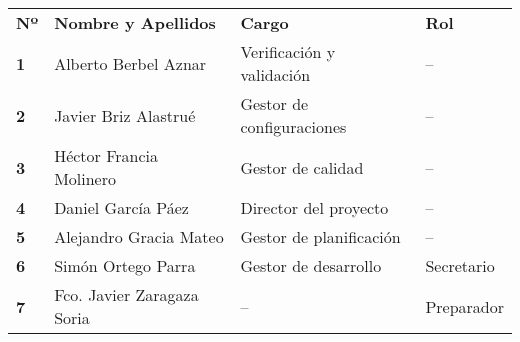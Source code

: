 \begin{longtable}{ | C{\tabcolsep} |
                     L{\tabcolsep} |
                     C{\tabcolsep} |
                     C{\tabcolsep} | }
\hline %
 \\
\hline %
{\bf Nº} & {\bf Nombre y Apellidos} & {\bf Cargo} & {\bf Rol} \\
\hline %
{\bf 1} & Alberto Berbel Aznar & Verificación y validación & --  \\
\hline %
{\bf 2} & Javier Briz Alastrué & Gestor de configuraciones & --  \\
\hline %
{\bf 3} & Héctor Francia Molinero & Gestor de calidad & --  \\
\hline %
{\bf 4} & Daniel García Páez & Director del proyecto & -- \\
\hline %
{\bf 5} & Alejandro Gracia Mateo & Gestor de planificación & --  \\
\hline %
{\bf 6} & Simón Ortego Parra & Gestor de desarrollo & Secretario  \\
\hline %
{\bf 7} & Fco. Javier Zaragaza Soria & -- & Preparador  \\
\hline %
\end{longtable}

